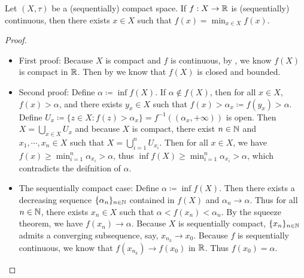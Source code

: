\documentclass{techreport}
\begin{document}
\begin{theorem}\label{The:Weierstrass}
	Let $(X,\tau)$ be a (sequentially) compact space.
	If $f: X\to\mathbb{R}$ is (sequentially) continuous, then there exists $x \in X$ such that $f(x) = \min_{x \in X} f(x)$.
\end{theorem}
\begin{proof}
	\begin{itemize}
		\item First proof: Because $X$ is compact and $f$ is continuous, by , we know $f(X)$ is compact in $\mathbb{R}$.
		Then by  we know that $f(X)$ is closed and bounded.
		
		\item Second proof: Define $\alpha \coloneqq \inf f(X)$.
		If $\alpha \not\in f(X)$, then for all $x \in X$, $f(x) > \alpha$, and there exists $y_x \in X$ such that $f(x) > \alpha_x \coloneqq f(y_x) > \alpha$.
		Define $U_x \coloneqq \{ z \in X : f(z) > \alpha_x \} = f^{-1}((\alpha_x,+\infty))$ is open.
		Then $X = \bigcup_{x \in X} U_x$ and because $X$ is compact, there exist $n \in \mathbb{N}$ and $x_1,\cdots,x_n \in X$ such that $X = \bigcup_{i=1}^n U_{x_i}$.
		Then for all $x \in X$, we have $f(x) \ge \min_{i=1}^n \alpha_{x_i} > \alpha$, 
		thus $\inf f(X) \ge \min_{i=1}^n \alpha_{x_i} > \alpha$, which contradicts the deifnition of $\alpha$.
		
		\item The sequentially compact case: Define $\alpha \coloneqq \inf f(X)$.
		Then there exists a decreasing sequence $\{\alpha_n\}_{n \in \mathbb{N}}$ contained in $f(X)$ and $\alpha_n \rightarrow \alpha$.
		Thus for all $n \in \mathbb{N}$, there exists $x_n \in X$ such that $\alpha < f(x_n) < \alpha_n$.
		By the squeeze theorem, we have $f(x_n) \rightarrow \alpha$.
		Because $X$ is sequentially compact, $\{x_n\}_{n \in \mathbb{N}}$ admits a converging subsequence, say, $x_{n_k} \rightarrow x_0$.
		Because $f$ is sequentially continuous, we know that $f(x_{n_k}) \rightarrow f(x_0)$ in $\mathbb{R}$.
		Thus $f(x_0) = \alpha$.
	\end{itemize}
\end{proof}
\end{document}
